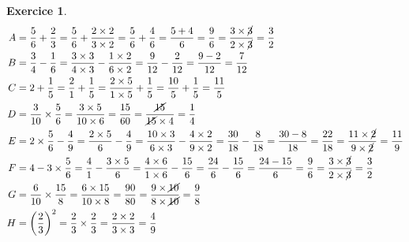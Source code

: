 \documentclass[10pt]{article}
\newtheorem{exo}{Exercice}
\begin{document}
\begin{exo}

\begin{align*}
A&=\frac{5}{6}+\frac{2}{3}=\frac{5}{6}+\frac{2\times 2}{3\times 2}=\frac{5}{6}+\frac{4}{6}=\frac{5+4}{6}=\frac{9}{6}=\frac{3\times \cancel{3}}{2\times \cancel{3}}=\frac{3}{2}\\
B&=\frac{3}{4}-\frac{1}{6}=\frac{3\times 3}{4\times 3}-\frac{1\times 2}{6\times 2}=\frac{9}{12}-\frac{2}{12}=\frac{9-2}{12}=\frac{7}{12}
\\
C&=2+\frac{1}{5}=\frac{2}{1}+\frac{1}{5}=\frac{2\times 5}{1\times 5}+\frac{1}{5}=\frac{10}{5}+\frac{1}{5}=\frac{11}{5}\\
D&=\frac{3}{10}\times \frac{5}{6}=\frac{3\times 5}{10\times 6}=\frac{15}{60}=\frac{\cancel{15}}{\cancel{15}\times 4}=\frac{1}{4}\\
E&=2\times\frac{5}{6}-\frac{4}{9}=\frac{2\times 5}{6}-\frac{4}{9}=\frac{10\times 3}{6\times 3}-\frac{4\times 2}{9\times 2}=\frac{30}{18}-\frac{8}{18}=\frac{30-8}{18}=\frac{22}{18}=\frac{11\times \cancel{2}}{9\times \cancel{2}}=\frac{11}{9}\\
F&=4-3\times\frac{5}{6}=\frac{4}{1}-\frac{3\times 5}{6}=\frac{4\times 6}{1\times 6}-\frac{15}{6}=\frac{24}{6}-\frac{15}{6}=\frac{24-15}{6}=\frac{9}{6}=\frac{3\times \cancel{3}}{2\times \cancel{3}}=\frac{3}{2}
\\
G&=\frac{6}{10}\times \frac{15}{8}=\frac{6\times 15}{10\times 8}=\frac{90}{80}=\frac{9\times \cancel{10}}{8\times \cancel{10}}=\frac{9}{8}\\
H&=\left(\frac{2}{3}\right)^2=\frac{2}{3}\times\frac{2}{3}=\frac{2\times 2}{3\times 3}=\frac{4}{9}
\end{align*}

\end{exo}
\end{document}
